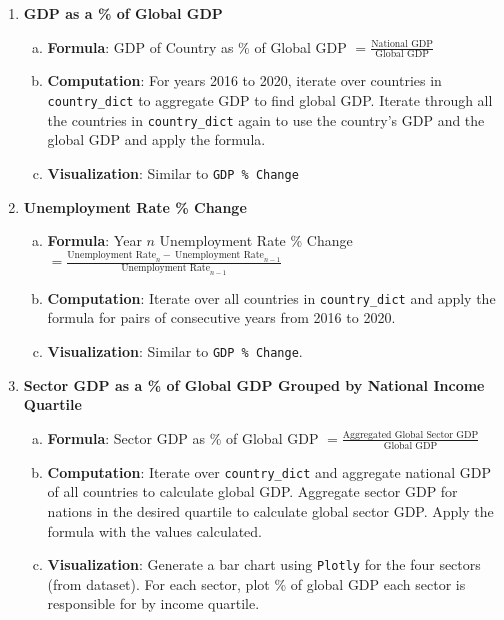 \documentclass[fontsize=11pt]{article}
\begin{document}
\begin{enumerate}
        \item \textbf{GDP as a \% of Global GDP}
            \begin{enumerate}[(a)]
                \item \textbf{Formula}: GDP of Country as \% of Global GDP $= \frac{\text{National GDP}}{\text{Global GDP}}$
                \item \textbf{Computation}: For years 2016 to 2020, iterate over countries in \texttt{country\_dict} to aggregate GDP to find global GDP. Iterate through all the countries in \texttt{country\_dict} again to use the country's GDP and the global GDP and apply the formula.
                \item \textbf{Visualization}: Similar to \texttt{GDP \% Change}
            \end{enumerate}
        \item \textbf{Unemployment Rate \% Change}
            \begin{enumerate}[(a)]
                \item \textbf{Formula}: Year $n$ Unemployment Rate \% Change $= \frac{\text{Unemployment \ Rate}_{n}-\  \text{Unemployment \ Rate}_{n-1}}{\text{Unemployment \ Rate}_{n-1}}$
                \item \textbf{Computation}: Iterate over all countries in \texttt{country\_dict} and apply the formula for pairs of consecutive years from 2016 to 2020.
                \item \textbf{Visualization}: Similar to \texttt{GDP \% Change}.
            \end{enumerate}
        \item \textbf{Sector GDP as a \% of Global GDP Grouped by National Income Quartile}
            \begin{enumerate}[(a)]
                \item \textbf{Formula}: Sector GDP as \% of Global GDP $= \frac{\text{Aggregated \ Global \ Sector \ GDP}}{\text{Global \ GDP}}$
                \item \textbf{Computation}: Iterate over \texttt{country\_dict} and aggregate national GDP of all countries to calculate global GDP. Aggregate sector GDP for nations in the desired quartile to calculate global sector GDP. Apply the formula with the values calculated.
                \item \textbf{Visualization}: Generate a bar chart using \texttt{Plotly} for the four sectors (from dataset). For each sector, plot \% of global GDP each sector is responsible for by income quartile.
            \end{enumerate}


\end{enumerate}
\end{document}
